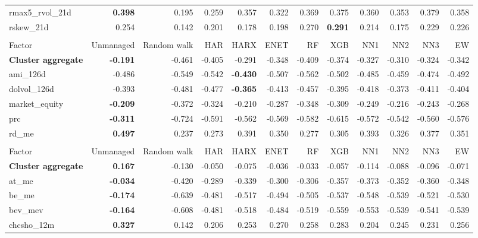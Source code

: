 \begin{landscape}
\begin{longtable}{>{\raggedright\arraybackslash}p{2.6cm}rrrrrrrrrrr}
rmax5\_rvol\_21d & \textbf{0.398} & 0.195 & 0.259 & 0.357 & 0.322 & 0.369 & 0.375 & 0.360 & 0.353 & 0.379 & 0.358 \\
rskew\_21d & 0.254 & 0.142 & 0.201 & 0.178 & 0.198 & \cellcolor{blue!10}0.270 & \textbf{\cellcolor{blue!10}0.291} & 0.214 & 0.175 & 0.229 & 0.226 \\
\hline
\multicolumn{12}{@{}l}{\textit{Panel L. Size}} \\
\hline
Factor & Unmanaged & Random walk & HAR & HARX & ENET & RF & XGB & NN1 & NN2 & NN3 & EW \\
\hline
\textbf{Cluster aggregate} & \textbf{-0.191} & -0.461 & -0.405 & -0.291 & -0.348 & -0.409 & -0.374 & -0.327 & -0.310 & -0.324 & -0.342 \\
ami\_126d & -0.486 & -0.549 & -0.542 & \textbf{\cellcolor{blue!10}-0.430} & -0.507 & -0.562 & -0.502 & \cellcolor{blue!10}-0.485 & \cellcolor{blue!10}-0.459 & \cellcolor{blue!10}-0.474 & -0.492 \\
dolvol\_126d & -0.393 & -0.481 & -0.477 & \textbf{\cellcolor{blue!10}-0.365} & -0.413 & -0.457 & -0.395 & -0.418 & \cellcolor{blue!10}-0.373 & -0.411 & -0.404 \\
market\_equity & \textbf{-0.209} & -0.372 & -0.324 & -0.210 & -0.287 & -0.348 & -0.309 & -0.249 & -0.216 & -0.243 & -0.268 \\
prc & \textbf{-0.311} & -0.724 & -0.591 & -0.562 & -0.569 & -0.582 & -0.615 & -0.572 & -0.542 & -0.560 & -0.576 \\
rd\_me & \textbf{0.497} & 0.237 & 0.273 & 0.391 & 0.350 & 0.277 & 0.305 & 0.393 & 0.326 & 0.377 & 0.351 \\
\hline
\multicolumn{12}{@{}l}{\textit{Panel M. Value}} \\
\hline
Factor & Unmanaged & Random walk & HAR & HARX & ENET & RF & XGB & NN1 & NN2 & NN3 & EW \\
\hline
\textbf{Cluster aggregate} & \textbf{0.167} & -0.130 & -0.050 & -0.075 & -0.036 & -0.033 & -0.057 & -0.114 & -0.088 & -0.096 & -0.071 \\
at\_me & \textbf{-0.034} & -0.420 & -0.289 & -0.339 & -0.300 & -0.306 & -0.357 & -0.373 & -0.352 & -0.360 & -0.348 \\
be\_me & \textbf{-0.174} & -0.639 & -0.481 & -0.517 & -0.494 & -0.505 & -0.537 & -0.548 & -0.539 & -0.521 & -0.530 \\
bev\_mev & \textbf{-0.164} & -0.608 & -0.481 & -0.518 & -0.484 & -0.519 & -0.559 & -0.553 & -0.539 & -0.541 & -0.539 \\
chcsho\_12m & \textbf{0.327} & 0.142 & 0.206 & 0.253 & 0.270 & 0.258 & 0.283 & 0.204 & 0.245 & 0.231 & 0.256 \\

\end{longtable}
\end{landscape}
